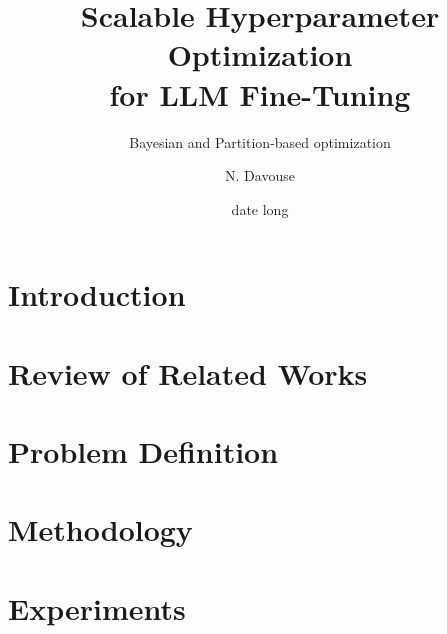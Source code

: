 \documentclass[A4,svgnames,9pt,aspectratio=169]{beamer}
\title[titrecourt]{Scalable Hyperparameter Optimization\\ for LLM
Fine-Tuning}
\subtitle{Bayesian and Partition-based optimization}
\date[12/11/2024]{date long}
\author[A. et al.]{N. Davouse}
\begin{document}

\frame{\titlepage}


\renewcommand{\contentsname}{Summary}



\frame{\tocpage}

\section{Introduction}
\frame{\sectionpage}


\section{Review of Related Works}
\frame{\sectionpage}


\section{Problem Definition}
\frame{\sectionpage}


\section{Methodology}
\frame{\sectionpage}


\section{Experiments}
\frame{\sectionpage}

\end{document}
